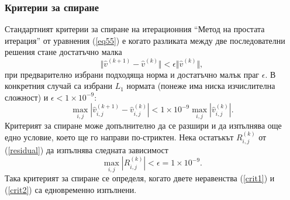 \documentclass[a4paper]{article}
\newcommand{\rf}[1]{(\ref{#1})}
\theoremstyle{remark}
\begin{document}
\subsubsection{Критерии за спиране}
Стандартният критерии за спиране на итерационния ``Метод на простата итерация'' от уравнения \rf{eq55} е когато разликата между две последователни решения стане достатъчно малка
\begin{equation*}
\Vert \widehat{v}^{(k+1)}-\widehat{v}^{(k)}\Vert  < \epsilon \Vert \widehat{v}^{(k)}\Vert ,
\end{equation*}
при предварително избрани подходяща норма и достатъчно малък праг $\epsilon$. В конкретния случай са избрани $L_1$ нормата (понеже има ниска изчислителна сложност) и $\epsilon < 1\times10^{-9}$:
\begin{equation}\label{crit1}
\max_{i,j} |\widehat{v}^{(k+1)}_{i,j}-\widehat{v}^{(k)}_{i,j}| < 1\times10^{-9} \max_{i,j} |\widehat{v}^{(k)}_{i,j}|.
\end{equation}
Критерият за спиране може допълнително да се разшири и да изпълнява още едно условие, което ще го направи по-стриктен. Нека остатъкът $R_{i,j}^{(k)}$ от \rf{residual} да изпълнява следната зависимост
\begin{equation}\label{crit2}
\max_{i,j} |R_{i,j}^{(k)}| < \epsilon = 1\times10^{-9}.
\end{equation}
Така критерият за спиране се определя, когато двете неравенства \rf{crit1} и \rf{crit2} са едновременно изпълнени.
\end{document}
